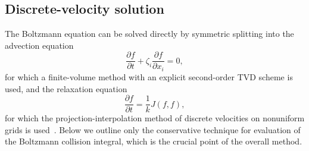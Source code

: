 \documentclass[aip,pof,preprint]{revtex4-1}
\newcommand{\pder}[2][]{\frac{\partial#1}{\partial#2}}
\begin{document}
\subsection{Discrete-velocity solution}

The Boltzmann equation can be solved directly by symmetric splitting
into the advection equation
\begin{equation}\label{eq:split_advection}
    \pder[f]{t} + \zeta_i\pder[f]{x_i} = 0,
\end{equation}
for which a finite-volume method with an explicit second-order TVD scheme is used,
and the relaxation equation
\begin{equation}\label{eq:split_integral}
    \pder[f]{t} = \frac1k J(f,f),
\end{equation}
for which the projection-interpolation method of discrete velocities
on nonuniform grids is used~\cite{Dodulad2015}.
Below we outline only the conservative technique for evaluation
of the Boltzmann collision integral, which is the crucial point of the overall method.
\end{document}
